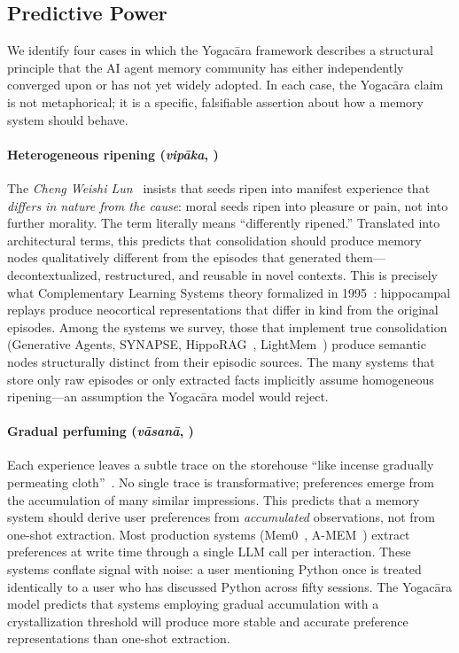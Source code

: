 \subsection{Predictive Power}
\label{sec:yogacara-predictive}

We identify four cases in which the Yogac\=ara framework describes a
structural principle that the AI agent memory community has either
independently converged upon or has not yet widely adopted.  In each
case, the Yogac\=ara claim is not metaphorical; it is a specific,
falsifiable assertion about how a memory system should behave.

\paragraph{Heterogeneous ripening (\emph{vip\=aka}, )}
The \emph{Cheng Weishi Lun}~\cite{chengweishilun} insists that seeds
ripen into manifest experience that \emph{differs in nature from the
cause}: moral seeds ripen into pleasure or pain, not into further
morality.  The term  literally means ``differently
ripened.''  Translated into architectural terms, this predicts that
consolidation should produce memory nodes qualitatively different from
the episodes that generated them---decontextualized, restructured, and
reusable in novel contexts.  This is precisely what Complementary
Learning Systems theory formalized in 1995~\cite{mcclelland1995}:
hippocampal replays produce neocortical representations that differ in
kind from the original episodes.  Among the systems we survey,
those that implement true consolidation (Generative Agents,
SYNAPSE, HippoRAG~\cite{gutierrez2024hipporag}, LightMem~\cite{fang2025lightmem}) produce
semantic nodes structurally distinct from their episodic sources.  The
many systems that store only raw episodes or only extracted facts
implicitly assume homogeneous ripening---an assumption the Yogac\=ara
model would reject.

\paragraph{Gradual perfuming (\emph{v\=asan\=a}, )}
Each experience leaves a subtle trace on the storehouse ``like incense
gradually permeating cloth''~\cite{yogacarabhumi}.  No single trace is
transformative; preferences emerge from the accumulation of many similar
impressions.  This predicts that a memory system should derive user
preferences from \emph{accumulated} observations, not from one-shot
extraction.  Most production systems (Mem0~\cite{choudhary2025mem0},
A-MEM~\cite{xu2025amem}) extract preferences at write time through a
single LLM call per interaction.  These systems conflate signal with
noise: a user mentioning Python once is treated identically to a user
who has discussed Python across fifty sessions.  The Yogac\=ara model
predicts that systems employing gradual accumulation with a
crystallization threshold will produce more stable and
accurate preference representations than one-shot extraction.

